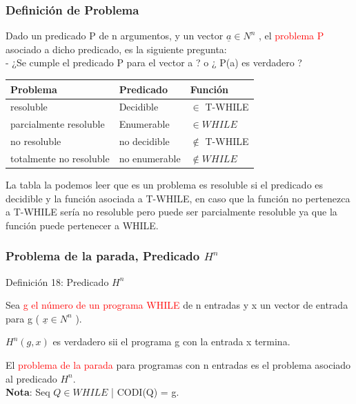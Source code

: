 \documentclass[xcolor=table]{beamer}
\begin{document}
\begin{frame}[fragile]\frametitle{Definición de Problema} \scriptsize

Dado un predicado P de n argumentos, y un vector $\underline{a} \in N^n$ , el \textcolor{red}{problema P} asociado a dicho predicado, es la siguiente pregunta: \\

- ¿Se cumple el predicado P para el vector a ? o ¿ P(a) es verdadero ?

\begin{table}[!ht]
\begin{tabular}{|l|l|l|}
\hline
\rowcolor[HTML]{C0C0C0} 
\textbf{Problema}                & \textbf{Predicado}     & \textbf{Función}       \\ \hline
resoluble               & Decidible     & $\in$ T-WHILE    \\ \hline
parcialmente resoluble  & Enumerable    & $\in WHILE$     \\ \hline
no resoluble            & no decidible  & $\notin$ T-WHILE \\ \hline
totalmente no resoluble & no enumerable & $\notin WHILE$  \\ \hline
\end{tabular}
\end{table}

La tabla la podemos leer que es un problema es resoluble si el predicado es decidible y la función asociada a T-WHILE, en caso que la función no pertenezca a T-WHILE sería no resoluble pero puede ser parcialmente resoluble ya que la función puede pertenecer a WHILE.
\end{frame}

\begin{frame}[fragile]\frametitle{Problema de la parada, Predicado $H^n$} \scriptsize

\begin{block}{Definición 18: Predicado $H^n$ }
\end{block}
Sea \textcolor{red}{g el número de un programa WHILE} de n entradas y x un vector de entrada para g ( $\underline{x} \in N^n$ ).

\begin{center}
$H^n(g,x)$ es verdadero sii el programa g con la entrada x termina.    
\end{center}

El \textcolor{red}{problema de la parada} para programas con n entradas es el problema asociado al predicado $H^n$.\\

\textbf{Nota}: Seq $Q \in WHILE$ | CODI(Q) = g.

\end{frame}
\end{document}
